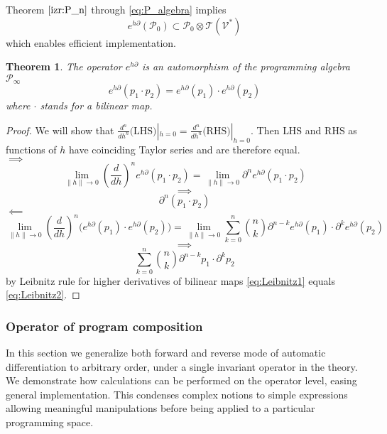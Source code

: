 \documentclass[preprint,12pt]{elsarticle}
\newcommand{\T}{\mathcal{T}}
\newcommand{\VV}{\mathcal{V}}
\newcommand{\dP}{\mathcal{P}}
\newcommand{\D}{\partial}
\newtheorem{izrek}{Theorem}[section]
\begin{document}
 Theorem $\ref{izr:P_n}$ through \eqref{eq:P_algebra} implies
     \begin{equation}
     	e^{h\D}(\dP_0)\subset\dP_0\otimes \T(\VV^*)
     \end{equation}      
which enables efficient implementation.
 
 \begin{izrek}\label{izr:prod}
 The operator $e^{h\D}$ is an automorphism of the programming algebra $\dP_\infty$
 \begin{equation}
 	e^{h\D}(p_1\cdot p_2)=e^{h\D}(p_1)\cdot e^{h\D}(p_2)
 \end{equation}
 where $\cdot$ stands for a bilinear map.
 \end{izrek}
 
 \begin{proof}
 We will show that $\frac{d^n}{dh^n}\text{(LHS)}|_{h=0}=\frac{d^n}{dh^n}\text{(RHS)}|_{h=0}$. Then $\text{LHS}$ and $\text{RHS}$ as functions
 of $h$ have coinciding Taylor series and are therefore equal.\\
  $\implies$
  $$\lim\limits_{\lVert h\rVert\to 0}(\frac{d}{dh})^ne^{h\D}(p_1\cdot p_2)=\lim\limits_{\lVert h\rVert\to 0}\D^ne^{h\D}(p_1\cdot p_2)$$
  $$\implies$$
  \begin{equation}\label{eq:Leibnitz1}
  \D^n(p_1\cdot p_2)
  \end{equation}
  $\impliedby$
  $$\lim\limits_{\lVert h\rVert\to 0}(\frac{d}{dh})^n\Big(e^{h\D}(p_1)\cdot e^{h\D}(p_2)\Big)=\lim\limits_{\lVert h\rVert\to 0}\sum\limits_{k=0}^{n}{n\choose k}\D^{n-k}e^{h\D}(p_1)\cdot \D^ke^{h\D}(p_2)$$
  $$\implies$$
  \begin{equation}\label{eq:Leibnitz2}
  \sum\limits_{k=0}^{n}{n\choose k}\D^{n-k}p_1\cdot \D^kp_2
  \end{equation}
  by Leibnitz rule for higher derivatives of bilinear maps \eqref{eq:Leibnitz1} equals \eqref{eq:Leibnitz2}.
 \end{proof}
 
 \subsubsection{Operator of program composition}\label{sec:compsition}
 
 In this section we generalize both forward \cite{PcAD} and reverse \cite{ReverseAD} mode of automatic differentiation to arbitrary order, under a single invariant operator in the theory. We demonstrate how calculations can be performed on the operator level, easing general implementation. This condenses complex notions to simple expressions allowing meaningful manipulations before being applied to a particular programming space.
 
\end{document}
